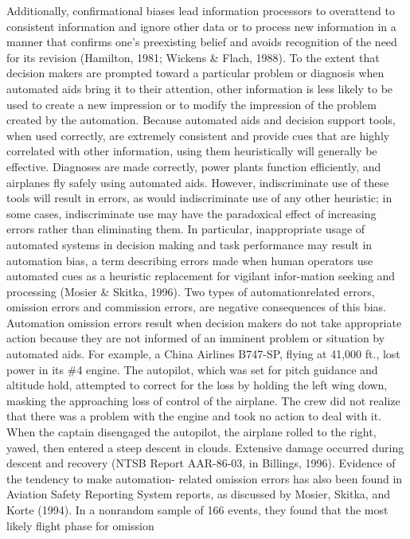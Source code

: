 \documentclass[utf8,bachelor,manualbib]{gradu3}
\begin{document}
Additionally, confirmational biases lead information processors to overattend
to consistent information and ignore other data or to process new information
in a manner that confirms one's preexisting belief and avoids recognition of the
need for its revision (Hamilton, 1981; Wickens \& Flach, 1988). To the extent that
decision makers are prompted toward a particular problem or diagnosis when
automated aids bring it to their attention, other information is less likely to be used
to create a new impression or to modify the impression of the problem created by
the automation.
Because automated aids and decision support tools, when used correctly, are
extremely consistent and provide cues that are highly correlated with other information,
using them heuristically will generally be effective. Diagnoses are made
correctly, power plants function efficiently, and airplanes fly safely using automated
aids. However, indiscriminate use of these tools will result in errors, as would
indiscriminate use of any other heuristic; in some cases, indiscriminate use may
have the paradoxical effect of increasing errors rather than eliminating them. In
particular, inappropriate usage of automated systems in decision making and task
performance may result in automation bias, a term describing errors made when
human operators use automated cues as a heuristic replacement for vigilant infor-mation seeking and processing (Mosier \& Skitka, 1996). Two types of automationrelated
errors, omission errors and commission errors, are negative consequences
of this bias.
Automation omission errors result when decision makers do not take appropriate
action because they are not informed of an imminent problem or situation by
automated aids. For example, a China Airlines B747-SP, flying at 41,000 ft., lost
power in its \#4 engine. The autopilot, which was set for pitch guidance and altitude
hold, attempted to correct for the loss by holding the left wing down, masking the
approaching loss of control of the airplane. The crew did not realize that there was
a problem with the engine and took no action to deal with it. When the captain
disengaged the autopilot, the airplane rolled to the right, yawed, then entered a steep
descent in clouds. Extensive damage occurred during descent and recovery (NTSB
Report AAR-86-03, in Billings, 1996). Evidence of the tendency to make automation-
related omission errors has also been found in Aviation Safety Reporting
System reports, as discussed by Mosier, Skitka, and Korte (1994). In a nonrandom
sample of 166 events, they found that the most likely flight phase for omission
\end{document}
